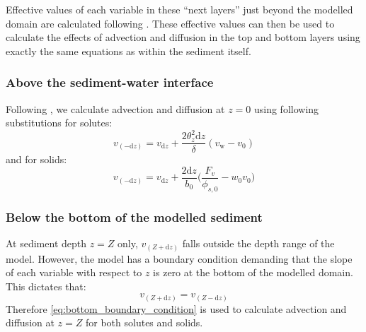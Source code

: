 \documentclass[a4paper]{article}
\newcommand{\D}[1]{\mathrm{d}#1}
\begin{document}
Effective values of each variable in these ``next layers'' just beyond the modelled domain are calculated following \citet{boudreau_method_1996}.  These effective values can then be used to calculate the effects of advection and diffusion in the top and bottom layers using exactly the same equations as within the sediment itself.


\subsubsection{Above the sediment-water interface}

Following \citet{boudreau_method_1996}, we calculate advection and diffusion at $z = 0$ using following substitutions for solutes:
\begin{equation}\label{Dv0}
v_{(-\D{z})} = v_{\D{z}} + \frac{2 \theta_z^2 \D{z}}{\delta} (v_\mathrm{w} - v_0)
\end{equation}
and for solids:
\begin{equation}
v_{(-\D{z})} = v_{\D{z}} + \frac{2 \D{z}}{b_0} \Bigg( \frac{F_v}{\phi_{s, 0}} - w_0 v_0 \Bigg)
\end{equation}


\subsubsection{Below the bottom of the modelled sediment}

At sediment depth $z = Z$ only, $v_{(Z+\D{z})}$ falls outside the depth range of the model.  However, the model has a boundary condition demanding that the slope of each variable with respect to $z$ is zero at the bottom of the modelled domain.  This dictates that:
\begin{equation}\label{eq:bottom_boundary_condition}
v_{(Z+\D{z})} = v_{(Z-\D{z})}
\end{equation}
Therefore \eqref{eq:bottom_boundary_condition} is used to calculate advection and diffusion at $z = Z$ for both solutes and solids.


\end{document}

